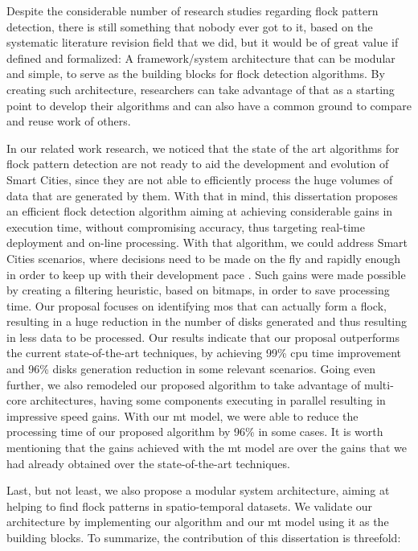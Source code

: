 Despite the considerable number of research studies regarding flock pattern detection, there is still something that
nobody ever got to it, based on the systematic literature revision field that we did, but it would be of great value if
defined and formalized: A framework/system architecture that can be modular and simple, to serve as the building blocks
for flock detection algorithms. By creating such architecture, researchers can take advantage of that as a starting
point to develop their algorithms and can also have a common ground to compare and reuse work of others.

In our related work research, we noticed that the state of the art algorithms for flock pattern detection are not ready
to aid the development and evolution of Smart Cities, since they are not able to efficiently process the huge volumes of
data that are generated by them. With that in mind, this dissertation proposes an efficient flock detection algorithm
aiming at achieving considerable gains in execution time, without compromising accuracy, thus targeting real-time
deployment and on-line processing. With that algorithm, we could address Smart Cities scenarios, where decisions need to
be made on the fly and rapidly enough in order to keep up with their development pace
\citep{ieeesmartcities}\citep{springersmartcities}. Such gains were made possible by creating a filtering heuristic,
based on bitmaps, in order to save processing time. Our proposal focuses on identifying \acp{mo} that can actually form
a flock, resulting in a huge reduction in the number of disks generated and thus resulting in less data to be processed.
Our results indicate that our proposal outperforms the current state-of-the-art techniques, by achieving 99\% \ac{cpu}
time improvement and 96\% disks generation reduction in some relevant scenarios. Going even further, we also remodeled
our proposed algorithm to take advantage of multi-core architectures, having some components executing in parallel
resulting in impressive speed gains. With our \ac{mt} model, we were able to reduce the processing time of our proposed
algorithm by 96\% in some cases. It is worth mentioning that the gains achieved with the \ac{mt} model are over the
gains that we had already obtained over the state-of-the-art techniques.

Last, but not least, we also propose a modular system architecture, aiming at helping to find flock patterns in
spatio-temporal datasets. We validate our architecture by implementing our algorithm and our \ac{mt} model using it as
the building blocks. To summarize, the contribution of this dissertation is threefold:

